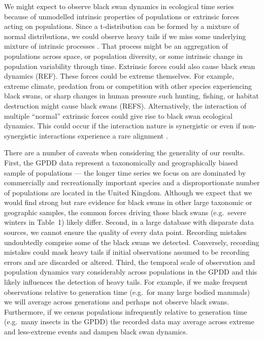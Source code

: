 We might expect to observe black swan dynamics in ecological time series
because of unmodelled intrinsic properties of populations or extrinsic forces
acting on populations. Since a t-distribution can be formed by a mixture of
normal distributions, we could observe heavy tails if we miss some underlying
mixture of intrinsic processes \citep{allen2001}. That process might be an
aggregation of populations across space, or population diversity, or some
intrinsic change in population variability through time. Extrinsic forces could
also cause black swan dynamics (REF). These forces could be extreme themselves.
For example, extreme climate, predation from or competition with other species
experiencing black swans, or sharp changes in human pressure such hunting,
fishing, or habitat destruction might cause black swans (REFS). Alternatively,
the interaction of multiple ``normal'' extrinsic forces could give rise to
black swan ecological dynamics. This could occur if the interaction nature is
synergistic \citep[e.g.][]{kirby2009} or even if non-synergistic interactions
experience a rare alignment \citep{denny2009}.

There are a number of caveats when considering the generality of our results.
First, the GPDD data represent a taxonomically and geographically biased sample
of populations --- the longer time series we focus on are dominated by
commercially and recreationally important species and a disproportionate number
of populations are located in the United Kingdom. Although we expect that we
would find strong but rare evidence for black swans in other large taxonomic or
geographic samples, the common forces driving those black swans (e.g.~severe
winters in Table~1) likely differ. Second, in a large database with disparate
data sources, we cannot ensure the quality of every data point. Recording
mistakes undoubtedly comprise some of the black swans we detected. Conversely,
recording mistakes could mask heavy tails if initial observations assumed to be
recording errors and are discarded or altered. Third, the temporal scale of
observation and population dynamics vary considerably across populations in the
GPDD and this likely influences the detection of heavy tails. For example, if
we make frequent observations relative to generation time (e.g.~for many large
bodied mammals) we will average across generations and perhaps not observe
black swans. Furthermore, if we census populations infrequently relative to
generation time (e.g.~many insects in the GPDD) the recorded data may average
across extreme and less-extreme events and dampen black swan dynamics.

